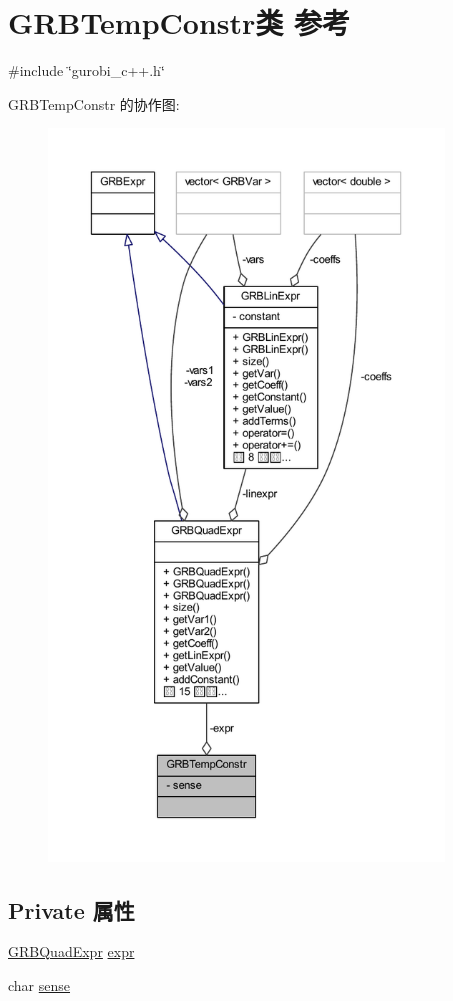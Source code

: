 \hypertarget{classGRBTempConstr}{}\section{G\+R\+B\+Temp\+Constr类 参考}
\label{classGRBTempConstr}


{\ttfamily \#include \char`\"{}gurobi\+\_\+c++.\+h\char`\"{}}



G\+R\+B\+Temp\+Constr 的协作图\+:
\nopagebreak
\begin{figure}[H]
\begin{center}
\leavevmode
\includegraphics[height=550pt]{classGRBTempConstr__coll__graph}
\end{center}
\end{figure}
\subsection*{Private 属性}
\begin{DoxyCompactItemize}
\item 
\hyperlink{classGRBQuadExpr}{G\+R\+B\+Quad\+Expr} \hyperlink{classGRBTempConstr_a42d7a1a82b833b4f68b1cf4918611746}{expr}
\item 
char \hyperlink{classGRBTempConstr_a6113993eccf6b8a16684d69f71c8cf0a}{sense}
\end{DoxyCompactItemize}
